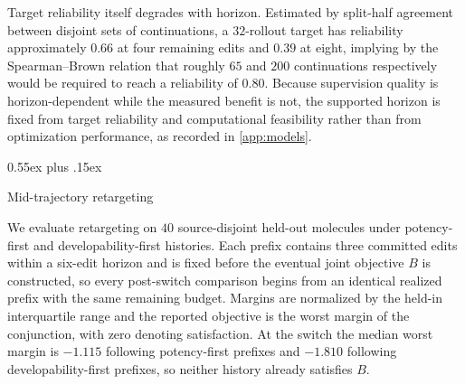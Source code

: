 \documentclass{article}
\makeatletter
\theoremstyle{definition}
\theoremstyle{remark}
\def\subsection{\@startsection{subsection}{2}{\z@}{-1.2ex plus -0.4ex minus -.2ex}%
  {0.55ex plus .15ex}{\normalsize\sc\raggedright}}
\makeatother
\begin{document}
Target reliability itself degrades with horizon. Estimated by split-half agreement between disjoint sets of continuations, a $32$-rollout target has reliability approximately $0.66$ at four remaining edits and $0.39$ at eight, implying by the Spearman--Brown relation that roughly $65$ and $200$ continuations respectively would be required to reach a reliability of $0.80$. Because supervision quality is horizon-dependent while the measured benefit is not, the supported horizon is fixed from target reliability and computational feasibility rather than from optimization performance, as recorded in \cref{app:models}.

\subsection{Mid-trajectory retargeting}
\label{app:exp-retarget}

We evaluate retargeting on $40$ source-disjoint held-out molecules under potency-first and developability-first histories. Each prefix contains three committed edits within a six-edit horizon and is fixed before the eventual joint objective $B$ is constructed, so every post-switch comparison begins from an identical realized prefix with the same remaining budget. Margins are normalized by the held-in interquartile range and the reported objective is the worst margin of the conjunction, with zero denoting satisfaction. At the switch the median worst margin is $-1.115$ following potency-first prefixes and $-1.810$ following developability-first prefixes, so neither history already satisfies $B$.
\end{document}
